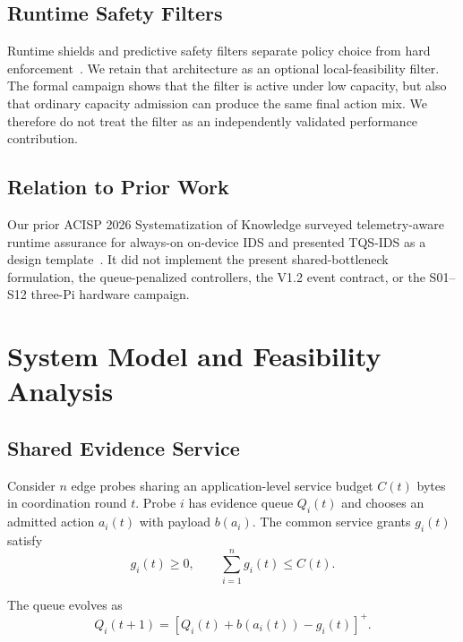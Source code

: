 \documentclass[10pt,journal]{IEEEtran}
\begin{document}
\subsection{Runtime Safety Filters}

Runtime shields and predictive safety filters separate policy choice
from hard enforcement~\cite{alshiekh2018shielding,wabersich2021filter}.
We retain that architecture as an optional local-feasibility filter.
The formal campaign shows that the filter is active under low capacity,
but also that ordinary capacity admission can produce the same final
action mix. We therefore do not treat the filter as an independently
validated performance contribution.

\subsection{Relation to Prior Work}

Our prior ACISP 2026 Systematization of Knowledge surveyed telemetry-aware
runtime assurance for always-on on-device IDS and presented TQS-IDS as a
design template~\cite{ouyang2026sok}. It did not implement the present
shared-bottleneck formulation, the queue-penalized controllers, the
V1.2 event contract, or the S01--S12 three-Pi hardware campaign.

\section{System Model and Feasibility Analysis}
\label{sec:model}

\subsection{Shared Evidence Service}

Consider $n$ edge probes sharing an application-level service budget
$C(t)$ bytes in coordination round $t$. Probe $i$ has evidence queue
$Q_i(t)$ and chooses an admitted action $a_i(t)$ with payload $b(a_i)$.
The common service grants $g_i(t)$ satisfy
\begin{equation}
g_i(t)\geq0,
\qquad
\sum_{i=1}^{n}g_i(t)\leq C(t).
\label{eq:cap}
\end{equation}

The queue evolves as
\begin{equation}
Q_i(t+1)
=
\left[
Q_i(t)+b(a_i(t))-g_i(t)
\right]^+ .
\label{eq:queue}
\end{equation}
\end{document}
